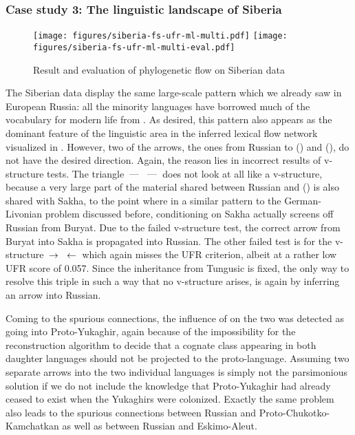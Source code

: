  
 \subsubsection{Case study 3: The linguistic landscape of Siberia} 
\begin{sidewaysfigure}
 \texttt{[image: figures/siberia-fs-ufr-ml-multi.pdf]}
 \vspace*{5mm}
 \texttt{[image: figures/siberia-fs-ufr-ml-multi-eval.pdf]}
 \caption{Result and evaluation of phylogenetic flow on Siberian data}
 \label{siberia-result-phylo}
\end{sidewaysfigure}
 The Siberian data display the same large-scale pattern which we already saw in European Russia: all the minority languages have borrowed much of the vocabulary for modern life from . As desired, this pattern also appears as the dominant feature of the linguistic area in the inferred lexical flow network visualized in . However, two of the arrows, the ones from Russian to  () and  (), do not have the desired direction. Again, the reason lies in incorrect results of v-structure tests. The triangle  $\kern 2pt\hbox{---}\kern 2pt$  $\kern 2pt\hbox{---}\kern 2pt$  does not look at all like a v-structure, because a very large part of the material shared between Russian and  () is also shared with Sakha, to the point where in a similar pattern to the German-Livonian problem discussed before, conditioning on Sakha actually screens off Russian from Buryat. Due to the failed v-structure test, the correct arrow from Buryat into Sakha is propagated into Russian. The other failed test is for the v-structure  $\kern 2pt\hbox{$\rightarrow$}\kern 2pt$  $\kern 2pt\hbox{$\leftarrow$}\kern 2pt$  which again misses the UFR criterion, albeit at a rather low UFR score of 0.057. Since the inheritance from Tungusic is fixed, the only way to resolve this triple in such a way that no v-structure arises, is again by inferring an arrow into Russian.
 
 Coming to the spurious connections, the influence of  on the two  was detected as going into Pro\-to-Yu\-ka\-ghir, again because of the impossibility for the reconstruction algorithm to decide that a cognate class appearing in both daughter languages should not be projected to the proto-lan\-guage. Assuming two separate arrows into the two individual languages is simply not the parsimonious solution if we do not include the knowledge that Proto-Yukaghir had already ceased to exist when the Yukaghirs were colonized. Exactly the same problem also leads to the spurious connections between Russian and Proto-Chukotko-Kamchatkan as well as between Russian and Eskimo-Aleut.
 
